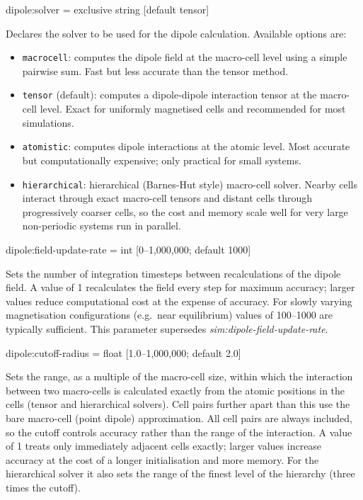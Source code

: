 {\zicf dipole:solver = exclusive string [default tensor]}
Declares the solver to be used for the dipole calculation. Available options are:
\begin{itemize}
  \item[] \texttt{macrocell}: computes the dipole field at the macro-cell level using a simple pairwise sum. Fast but less accurate than the tensor method.
  \item[] \texttt{tensor} (default): computes a dipole-dipole interaction tensor at the macro-cell level. Exact for uniformly magnetised cells and recommended for most simulations.
  \item[] \texttt{atomistic}: computes dipole interactions at the atomic level. Most accurate but computationally expensive; only practical for small systems.
  \item[] \texttt{hierarchical}: hierarchical (Barnes-Hut style) macro-cell solver. Nearby cells interact through exact macro-cell tensors and distant cells through progressively coarser cells, so the cost and memory scale well for very large non-periodic systems run in parallel.
\end{itemize}

{\zicf dipole:field-update-rate = int [0--1,000,000; default 1000]} Sets the number of integration timesteps between recalculations of the dipole field. A value of 1 recalculates the field every step for maximum accuracy; larger values reduce computational cost at the expense of accuracy. For slowly varying magnetisation configurations (e.g.\ near equilibrium) values of 100--1000 are typically sufficient. This parameter supersedes \textit{sim:dipole-field-update-rate}.

{\zicf dipole:cutoff-radius = float [1.0--1,000,000; default 2.0]} Sets the range, as a multiple of the macro-cell size, within which the interaction between two macro-cells is calculated exactly from the atomic positions in the cells (tensor and hierarchical solvers). Cell pairs further apart than this use the bare macro-cell (point dipole) approximation. All cell pairs are always included, so the cutoff controls accuracy rather than the range of the interaction. A value of 1 treats only immediately adjacent cells exactly; larger values increase accuracy at the cost of a longer initialisation and more memory. For the hierarchical solver it also sets the range of the finest level of the hierarchy (three times the cutoff).

